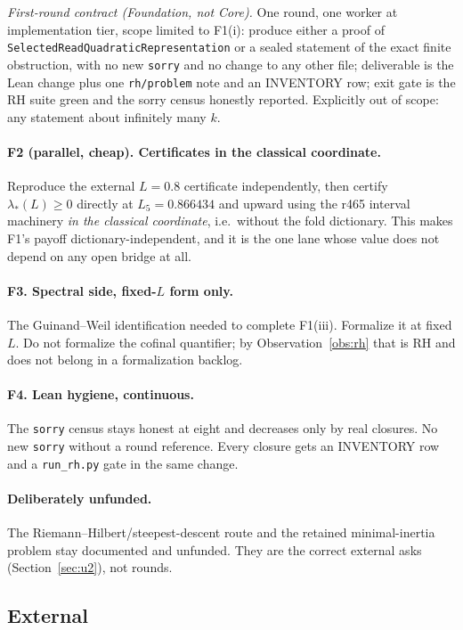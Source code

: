 \documentclass[11pt]{article}
\theoremstyle{remark}
\newcommand{\code}[1]{\nolinkurl{#1}}
\begin{document}
\emph{First-round contract (Foundation, not Core).}  One round, one
worker at implementation tier, scope limited to F1(i): produce either
a proof of \code{SelectedReadQuadraticRepresentation} or a sealed
statement of the exact finite obstruction, with no new
\code{sorry} and no change to any other file; deliverable is the Lean
change plus one \texttt{rh/problem} note and an INVENTORY row; exit
gate is the RH suite green and the sorry census honestly reported.
Explicitly out of scope: any statement about infinitely many $k$.

\paragraph{F2 (parallel, cheap).  Certificates in the classical
coordinate.}
Reproduce the external $L=0.8$ certificate independently, then
certify $\lambda_*(L)\ge0$ directly at $L_5=0.866434$ and upward
using the r465 interval machinery \emph{in the classical
coordinate}, i.e.\ without the fold dictionary.  This makes F1's
payoff dictionary-independent, and it is the one lane whose value
does not depend on any open bridge at all.

\paragraph{F3.  Spectral side, fixed-$L$ form only.}
The Guinand--Weil identification needed to complete F1(iii).
Formalize it at fixed $L$.  Do not formalize the cofinal quantifier;
by Observation~\ref{obs:rh} that is RH and does not belong in a
formalization backlog.

\paragraph{F4.  Lean hygiene, continuous.}
The \code{sorry} census stays honest at eight and decreases only by
real closures.  No new \code{sorry} without a round reference.  Every
closure gets an INVENTORY row and a \code{run_rh.py} gate in the same
change.

\paragraph{Deliberately unfunded.}
The Riemann--Hilbert/steepest-descent route and the retained
minimal-inertia problem stay documented and unfunded.  They are the
correct external asks (Section~\ref{sec:u2}), not rounds.

\subsection{External}
\end{document}
